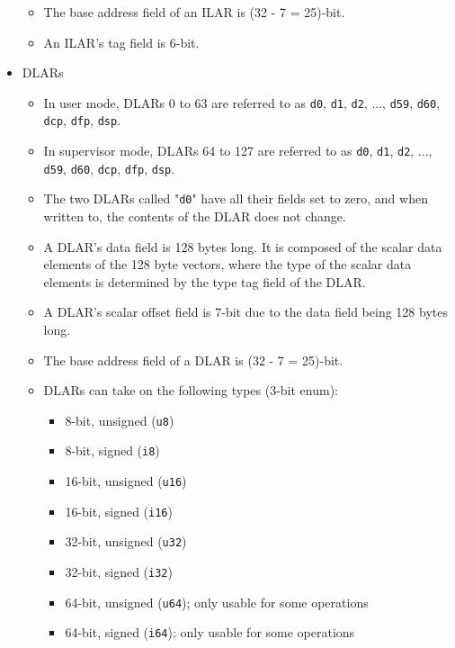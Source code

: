 \documentclass{article}
\begin{document}
\begin{itemize}
\begin{itemize}
		\item The base address field of an ILAR is (32 - 7 = 25)-bit.

		\item An ILAR's tag field is 6-bit.
		\end{itemize}

	\item DLARs
		\begin{itemize}
		\item In user mode, DLARs 0 to 63 are referred to as \texttt{d0},
		\texttt{d1}, \texttt{d2}, ..., \texttt{d59}, \texttt{d60},
		\texttt{dcp}, \texttt{dfp}, \texttt{dsp}.

		\item In supervisor mode, DLARs 64 to 127 are referred to as
		\texttt{d0}, \texttt{d1}, \texttt{d2}, ..., \texttt{d59},
		\texttt{d60}, \texttt{dcp}, \texttt{dfp}, \texttt{dsp}.

		\item The two DLARs called "\texttt{d0}" have all their
		fields set to zero, and when written to, the contents of the DLAR
		does not change.

		\item A DLAR's data field is 128 bytes long.  It is composed of the
		scalar data elements of the 128 byte vectors, where the type of the
		scalar data elements is determined by the type tag field of the
		DLAR.

		\item A DLAR's scalar offset field is 7-bit due to the data field
		being 128 bytes long.

		\item The base address field of a DLAR is (32 - 7 = 25)-bit.

		\item DLARs can take on the following types (3-bit enum):
			\begin{itemize}
			\item 8-bit, unsigned (\texttt{u8})
			\item 8-bit, signed (\texttt{i8})
			\item 16-bit, unsigned (\texttt{u16})
			\item 16-bit, signed (\texttt{i16})
			\item 32-bit, unsigned (\texttt{u32})
			\item 32-bit, signed (\texttt{i32})
			\item 64-bit, unsigned (\texttt{u64}); only usable for some
			operations
			\item 64-bit, signed (\texttt{i64}); only usable for some
			operations
			\end{itemize}


\end{itemize}
\end{itemize}
\end{document}

